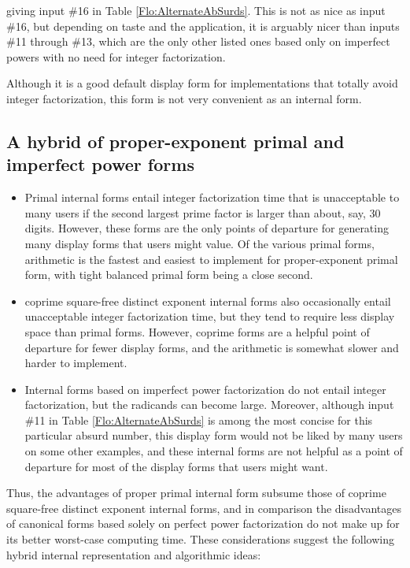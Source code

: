 \documentclass[12pt,english]{article}
\theoremstyle{definition}
\theoremstyle{remark}
\theoremstyle{plain}
\theoremstyle{plain}
\begin{document}
giving input \#16 in Table \ref{Flo:AlternateAbSurds}. This is not
as nice as input \#16, but depending on taste and the application,
it is arguably nicer than inputs \#11 through \#13, which are the
only other listed ones based only on imperfect powers with no need
for integer factorization.

Although it is a good default display form for implementations that
totally avoid integer factorization, this form is not very convenient
as an internal form.


\subsection{A hybrid of proper-exponent primal and imperfect power forms}
\begin{itemize}
\item Primal internal forms entail integer factorization time that is unacceptable
to many users if the second largest prime factor is larger than about,
say, 30 digits. However, these forms are the only points of departure
for generating many display forms that users might value. Of the various
primal forms, arithmetic is the fastest and easiest to implement for
proper-exponent primal form, with tight balanced primal form being
a close second.
\item coprime square-free distinct exponent internal forms also occasionally
entail unacceptable integer factorization time, but they tend to require
less display space than primal forms. However, coprime forms are a
helpful point of departure for fewer display forms, and the arithmetic
is somewhat slower and harder to implement.
\item Internal forms based on imperfect power factorization do not entail
integer factorization, but the radicands can become large. Moreover,
although input \#11 in Table \ref{Flo:AlternateAbSurds} is among
the most concise for this particular absurd number, this display form
would not be liked by many users on some other examples, and these
internal forms are not helpful as a point of departure for most of
the display forms that users might want. 
\end{itemize}
Thus, the advantages of proper primal internal form subsume those
of coprime square-free distinct exponent internal forms, and in comparison
the disadvantages of canonical forms based solely on perfect power
factorization do not make up for its better worst-case computing time.
These considerations suggest the following hybrid internal representation
and algorithmic ideas:
\end{document}
